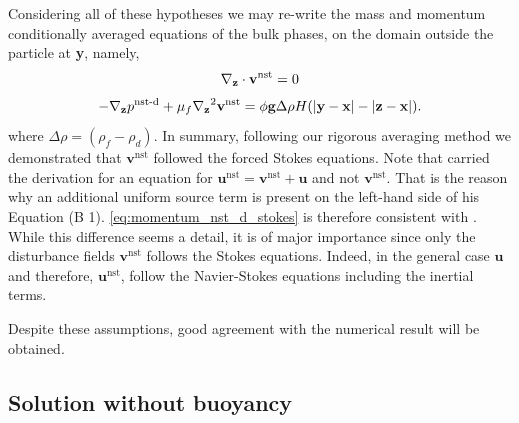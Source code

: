 Considering all of these hypotheses we may re-write the mass and momentum conditionally averaged equations of the bulk phases, on the domain outside the particle at \textbf{y}, namely,
\begin{equation}
    \pddz \cdot \textbf{v}^\text{nst}
    = 0
    \label{eq:mass_nst_d_stokes}
\end{equation}
\begin{equation}
    - \pddz p^\text{nst-d} 
    + \mu_f \pddz^2 \textbf{v}^\text{nst}
    = 
    \phi
    \textbf{g}
    \Delta\rho H(|\textbf{y} - \textbf{x}| - |\textbf{z} - \textbf{x}|). 
    \label{eq:momentum_nst_d_stokes}
\end{equation}
where $\Delta \rho = (\rho_f - \rho_d)$. 
In summary, following our rigorous averaging method we demonstrated that $\textbf{v}^\text{nst}$ followed the forced Stokes equations. 
Note that \citet{zhang2021ensemble} carried the derivation for an equation for $\textbf{u}^\text{nst} = \textbf{v}^\text{nst} + \textbf{u}$ and not $\textbf{v}^\text{nst}$. 
That is the reason why an additional uniform source term is present on the left-hand side of his Equation (B 1). 
\ref{eq:momentum_nst_d_stokes} is therefore consistent with \citet{zhang2021ensemble}. 
While this difference seems a detail, it is of major importance since only the disturbance fields $\textbf{v}^\text{nst}$ follows the Stokes equations.
Indeed, in the general case $\textbf{u}$ and therefore, $\textbf{u}^\text{nst}$, follow the Navier-Stokes equations including the inertial terms. 



Despite these assumptions, good agreement with the numerical result will be obtained. 



\subsection{Solution without buoyancy } 

